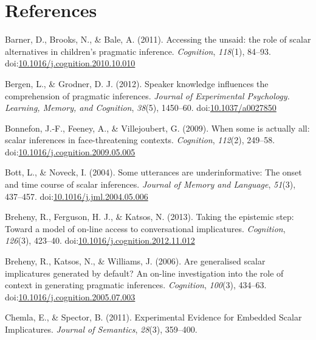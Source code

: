 \documentclass[floatsintext,man]{apa6}
\theoremstyle{definition}
\theoremstyle{definition}
\theoremstyle{definition}
\theoremstyle{remark}
\begin{document}
\newpage

\section{References}\label{references}

\setlength{\parindent}{-0.5in} \setlength{\leftskip}{0.5in}

\hypertarget{refs}{}
\hypertarget{ref-Barner2011}{}
Barner, D., Brooks, N., \& Bale, A. (2011). Accessing the unsaid: the
role of scalar alternatives in children's pragmatic inference.
\emph{Cognition}, \emph{118}(1), 84--93.
doi:\href{https://doi.org/10.1016/j.cognition.2010.10.010}{10.1016/j.cognition.2010.10.010}

\hypertarget{ref-Bergen2012}{}
Bergen, L., \& Grodner, D. J. (2012). Speaker knowledge influences the
comprehension of pragmatic inferences. \emph{Journal of Experimental
Psychology. Learning, Memory, and Cognition}, \emph{38}(5), 1450--60.
doi:\href{https://doi.org/10.1037/a0027850}{10.1037/a0027850}

\hypertarget{ref-Bonnefon2009}{}
Bonnefon, J.-F., Feeney, A., \& Villejoubert, G. (2009). When some is
actually all: scalar inferences in face-threatening contexts.
\emph{Cognition}, \emph{112}(2), 249--58.
doi:\href{https://doi.org/10.1016/j.cognition.2009.05.005}{10.1016/j.cognition.2009.05.005}

\hypertarget{ref-Bott2004}{}
Bott, L., \& Noveck, I. (2004). Some utterances are underinformative:
The onset and time course of scalar inferences. \emph{Journal of Memory
and Language}, \emph{51}(3), 437--457.
doi:\href{https://doi.org/10.1016/j.jml.2004.05.006}{10.1016/j.jml.2004.05.006}

\hypertarget{ref-Breheny2013}{}
Breheny, R., Ferguson, H. J., \& Katsos, N. (2013). Taking the epistemic
step: Toward a model of on-line access to conversational implicatures.
\emph{Cognition}, \emph{126}(3), 423--40.
doi:\href{https://doi.org/10.1016/j.cognition.2012.11.012}{10.1016/j.cognition.2012.11.012}

\hypertarget{ref-Breheny2006}{}
Breheny, R., Katsos, N., \& Williams, J. (2006). Are generalised scalar
implicatures generated by default? An on-line investigation into the
role of context in generating pragmatic inferences. \emph{Cognition},
\emph{100}(3), 434--63.
doi:\href{https://doi.org/10.1016/j.cognition.2005.07.003}{10.1016/j.cognition.2005.07.003}

\hypertarget{ref-Chemla2011}{}
Chemla, E., \& Spector, B. (2011). Experimental Evidence for Embedded
Scalar Implicatures. \emph{Journal of Semantics}, \emph{28}(3),
359--400.
\end{document}
